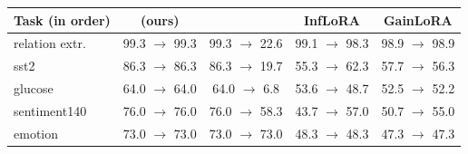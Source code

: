 \begin{tabular}{lcccc}
    \toprule
    Task (in order) & \cert{} (ours) & \plain{} & InfLoRA & GainLoRA \\
    \midrule
    relation extr. & 99.3 $\to$ 99.3 & 99.3 $\to$ 22.6 & 99.1 $\to$ 98.3 & 98.9 $\to$ 98.9 \\
    sst2 & 86.3 $\to$ 86.3 & 86.3 $\to$ 19.7 & 55.3 $\to$ 62.3 & 57.7 $\to$ 56.3 \\
    glucose & 64.0 $\to$ 64.0 & 64.0 $\to$ 6.8 & 53.6 $\to$ 48.7 & 52.5 $\to$ 52.2 \\
    sentiment140 & 76.0 $\to$ 76.0 & 76.0 $\to$ 58.3 & 43.7 $\to$ 57.0 & 50.7 $\to$ 55.0 \\
    emotion & 73.0 $\to$ 73.0 & 73.0 $\to$ 73.0 & 48.3 $\to$ 48.3 & 47.3 $\to$ 47.3 \\
    \bottomrule
\end{tabular}

